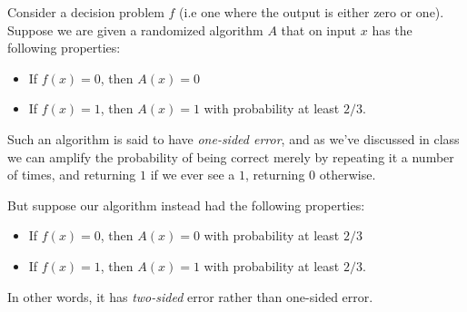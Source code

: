 \documentclass[addpoints]{exam}
\begin{document}
\begin{questions}
\begin{solution}
	
\end{solution}


  Consider a decision problem $f$ (i.e one where the output is either zero or
  one). Suppose we are given a randomized algorithm $A$ that on input $x$ has
  the following properties:
  \begin{itemize}
  \item If $f(x) = 0$, then $A(x) = 0$
  \item If $f(x) = 1$, then $A(x) = 1$ with probability at least $2/3$.
  \end{itemize}
  Such an algorithm is said to have \emph{one-sided error}, and as we've
  discussed in class we can amplify the probability of being correct merely by
  repeating it a number of times, and returning $1$ if we ever see a $1$,
  returning $0$ otherwise.

  But suppose our algorithm instead had the following properties:
  \begin{itemize}
  \item If $f(x) = 0$, then $A(x) = 0$ with probability at least $2/3$
  \item If $f(x) = 1$, then $A(x) = 1$ with probability at least $2/3$.
  \end{itemize}
  In other words, it has \emph{two-sided} error rather than one-sided error.


\end{questions}
\end{document}
